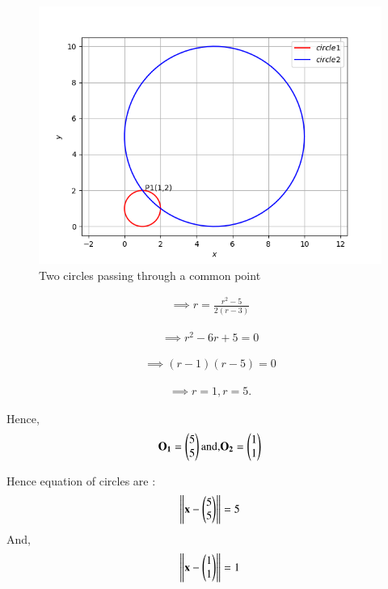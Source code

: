 \begin{figure}[htb!]	
	\centering	
	\includegraphics[width=\columnwidth]{./solutions/4/2/6/Circle.png}	
	\caption{Two circles passing through a common point}
	\label{eq:solutions/4/2/6/fig1}	
\end{figure}

\begin{align}
 \implies r  =  \frac{r^2 - 5}{2 \left(r - 3\right)} 
\end{align}


\begin{align}
\implies r^2 - 6r +5 = 0
\end{align}


\begin{align}
\implies \left( r -1\right) \left( r- 5\right) = 0
\end{align}

\begin{align}
\implies r = 1, r = 5.
\end{align}

Hence,
\begin{align}
\mathbf{O_1} = \begin{pmatrix}5 \\ 5 \\\end{pmatrix} \text{and,}  \mathbf{O_2} = \begin{pmatrix}1 \\ 1 \\\end{pmatrix}
\end{align}

Hence equation of circles are :
\begin{align}
\left\lVert\mathbf{x} - \begin{pmatrix}5 \\ 5 \\\end{pmatrix}\right\rVert = 5
\end{align}
And,
\begin{align}
\left\lVert\mathbf{x} - \begin{pmatrix}1 \\ 1 \\\end{pmatrix}\right\rVert = 1
\end{align}

